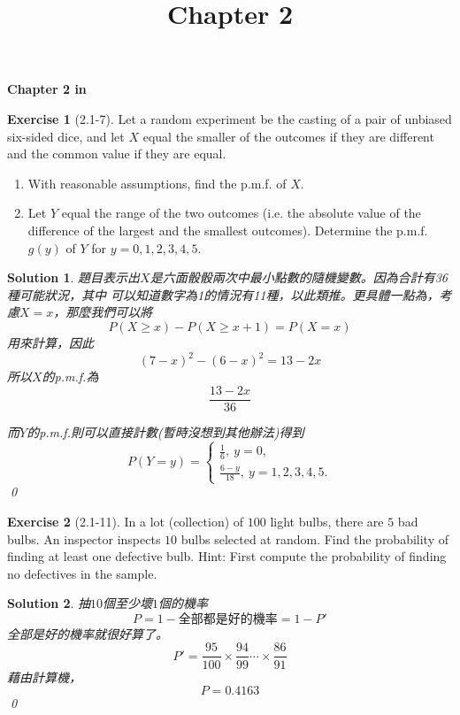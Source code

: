 \documentclass[14pt]{article}
\newtheorem*{solution}{Solution}
\theoremstyle{definition}
\newtheorem*{exercise}{Exercise}
\theoremstyle{remark}
\numberwithin{equation}{section}
\numberwithin{theorem}{section}
\begin{document}
\setcounter{section}{0}
\title{Chapter 2}

\thispagestyle{empty}
\begin{center}
{\LARGE \bf Chapter 2 in \cite{Hog10}}
\end{center}

\begin{exercise}[2.1-7]
    Let a random experiment be the casting of a pair of unbiased six-sided dice, 
    and let $X$ equal the smaller of the outcomes if they are different and the common 
    value if they are equal.
    \begin{enumerate}
    \item With reasonable assumptions, find the p.m.f. of $X$.
    \item Let $Y$ equal the range of the two outcomes (i.e. the absolute value of the difference
     of the largest and the smallest outcomes). Determine the p.m.f. $g(y)$ of $Y$ for $y=0, 1, 2, 3, 4, 5$.
    \end{enumerate}
\end{exercise}

\begin{solution}
題目表示出$X$是六面骰骰兩次中最小點數的隨機變數。因為合計有36種可能狀況，其中
可以知道數字為1的情況有11種，以此類推。更具體一點為，考慮$X=x$，那麼我們可以將 
\[
P(X\geq x)-P(X\geq x+1)=P(X=x)
\]
用來計算，因此
\[
(7-x)^2-(6-x)^2=13-2x
\]
所以$X$的p.m.f.為
\[
\frac{13-2x}{36}
\]

而$Y$的p.m.f.則可以直接計數(暫時沒想到其他辦法)得到
\[P(Y=y)=\begin{cases}
\frac{1}{6},\ y=0,\\
\frac{6-y}{18},\ y=1,2,3,4,5.
\end{cases}\]
\qed
\end{solution}


\begin{exercise}[2.1-11]
    In a lot (collection) of $100$ light bulbs, there are $5$ bad bulbs. An inspector
    inspects $10$ bulbs selected at random. Find the probability of finding at least 
    one defective bulb. Hint: First compute the probability of finding no defectives in 
    the sample.
\end{exercise}
\begin{solution}
    抽$10$個至少壞$1$個的機率
    $$
    P=1-\text{全部都是好的機率}=1-P'
    $$
    全部是好的機率就很好算了。
    $$
    P'=\frac{95}{100}\times\frac{94}{99}\cdots\times\frac{86}{91}
    $$
    藉由計算機，
    $$
    P=0.4163
    $$
    \qed
\end{solution}
\end{document}
